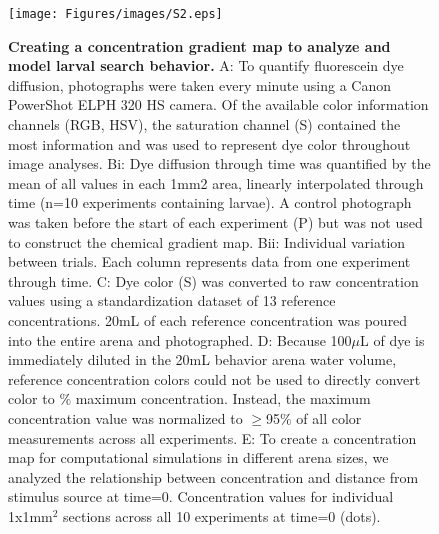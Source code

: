 \clearpage 
\begin{figure}[t!]
  \texttt{[image: Figures/images/S2.eps]}
  \caption{\textbf{Creating a concentration gradient map to analyze and model larval search behavior.} A: To quantify fluorescein dye diffusion, photographs were taken every minute using a Canon PowerShot ELPH 320 HS camera. Of the available color information channels (RGB, HSV), the saturation channel (S) contained the most information and was used to represent dye color throughout image analyses. Bi: Dye diffusion through time was quantified by the mean of all values in each 1mm2 area, linearly interpolated through time (n=10 experiments containing larvae). A control photograph was taken before the start of each experiment (P) but was not used to construct the chemical gradient map. Bii: Individual variation between trials. Each column represents data from one experiment through time. C: Dye color (S) was converted to raw concentration values using a standardization dataset of 13 reference concentrations. 20mL of each reference concentration was poured into the entire arena and photographed. D: Because 100${\mu}$L of dye is immediately diluted in the 20mL behavior arena water volume, reference concentration colors could not be used to directly convert color to ${\%}$ maximum concentration. Instead, the maximum concentration value was normalized to ${\geq}$95${\%}$ of all color measurements across all experiments. E: To create a concentration map for computational simulations in different arena sizes, we analyzed the relationship between concentration and distance from stimulus source at time=0. Concentration values for individual 1x1mm${^2}$ sections across all 10 experiments at time=0 (dots).
}
\end{figure}

\null
\vfill